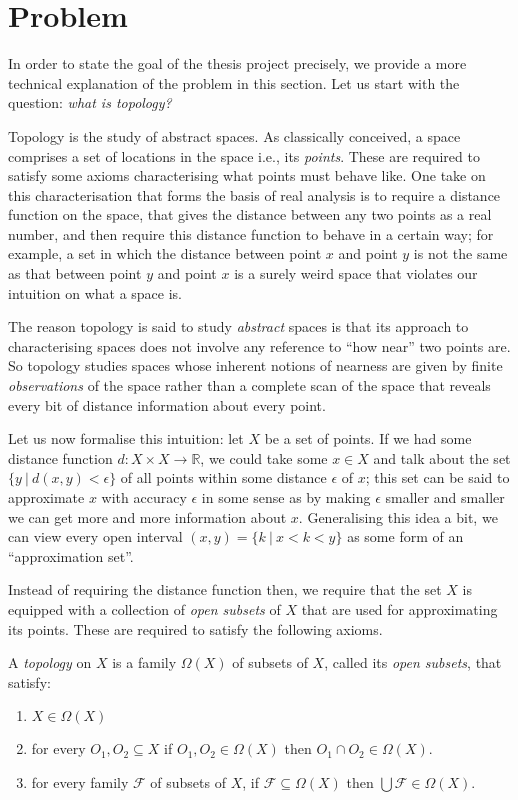 \documentclass{article}
\begin{document}
\section{Problem}\label{sec:problem}

In order to state the goal of the thesis project precisely, we provide a more technical
explanation of the problem in this section. Let us start with the question:
\emph{what is topology?}

Topology is the study of abstract spaces. As classically conceived, a space comprises a
set of locations in the space i.e., its \emph{points}. These are required to satisfy some
axioms characterising what points must behave like. One take on this characterisation that
forms the basis of real analysis is to require a distance function on the space, that
gives the distance between any two points as a real number, and then require this distance
function to behave in a certain way; for example, a set in which the distance between
point $x$ and point $y$ is not the same as that between point $y$ and point $x$ is a
surely weird space that violates our intuition on what a space is.

The reason topology is said to study \emph{abstract} spaces is that its approach to
characterising spaces does not involve any reference to ``how near'' two points are. So
topology studies spaces whose inherent notions of nearness are given by finite
\emph{observations} of the space rather than a complete scan of the space that reveals
every bit of distance information about every point.

Let us now formalise this intuition: let $X$ be a set of points. If we had some distance
function $d : X \times X \rightarrow \mathbb{R}$, we could take some $x \in X$ and talk about the set $\{
y\ |\ d(x, y) < \epsilon \}$ of all points within some distance $\epsilon$ of $x$; this set can be said
to approximate $x$ with accuracy $\epsilon$ in some sense as by making $\epsilon$ smaller and smaller we
can get more and more information about $x$. Generalising this idea a bit, we can view
every open interval $(x, y) = \{ k\ |\ x < k < y \}$ as some form of an ``approximation set''.

Instead of requiring the distance function then, we require that the set $X$ is equipped
with a collection of \emph{open subsets} of $X$ that are used for approximating its
points. These are required to satisfy the following axioms.

A \emph{topology} on $X$ is a family $\Omega(X)$ of subsets of $X$, called its
\emph{open subsets}, that satisfy:
\begin{enumerate}
  \item $X \in \Omega(X)$
  \item for every $O_1, O_2 \subseteq X$ if $O_1, O_2 \in \Omega(X)$ then $O_1 \cap O_2 \in \Omega(X)$.
  \item for every family $\mathcal{F}$ of subsets of $X$, if $\mathcal{F} \subseteq \Omega(X)$ then
    $\bigcup \mathcal{F} \in \Omega(X)$.
\end{enumerate}
\end{document}
